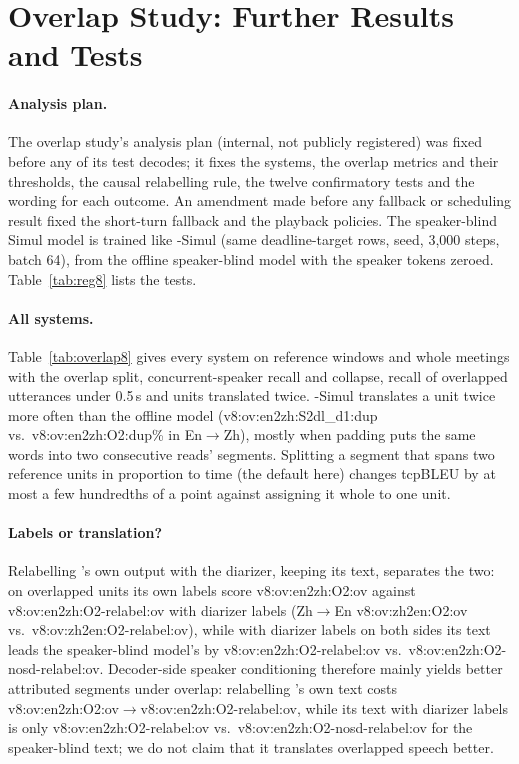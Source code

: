\section{Overlap Study: Further Results and Tests}
\label{app:v8}



\paragraph{Analysis plan.} The overlap study's analysis plan (internal, not publicly registered) was fixed before any
of its test decodes; it fixes the systems, the overlap metrics and their thresholds, the causal relabelling rule, the
twelve confirmatory tests and the wording for each outcome. An amendment made before any fallback or scheduling result
fixed the short-turn fallback and the playback policies.
The speaker-blind Simul model is trained like \sys{}-Simul (same deadline-target rows, seed, 3{,}000 steps, batch 64),
from the offline speaker-blind model with the speaker tokens zeroed. Table~\ref{tab:reg8} lists the tests.



\paragraph{All systems.} Table~\ref{tab:overlap8} gives every system on reference windows and whole meetings with the
overlap split, concurrent-speaker recall and collapse, recall of overlapped utterances under 0.5\,s and units translated
twice. \sys{}-Simul translates a unit twice more often than the offline model (\num{v8:ov:en2zh:S2dl_d1:dup} vs.\
\num{v8:ov:en2zh:O2:dup}\% in En$\rightarrow$Zh), mostly when padding puts the same words into two consecutive reads'
segments. Splitting a segment that spans two reference units in proportion to time (the default here) changes tcpBLEU by
at most a few hundredths of a point against assigning it whole to one unit.




\paragraph{Labels or translation?} Relabelling \sys{}'s own output with the diarizer, keeping its text, separates the
two: on overlapped units its own labels score \num{v8:ov:en2zh:O2:ov} against
\num{v8:ov:en2zh:O2-relabel:ov} with diarizer labels (Zh$\rightarrow$En \num{v8:ov:zh2en:O2:ov} vs.\
\num{v8:ov:zh2en:O2-relabel:ov}), while with diarizer labels on both sides its text leads the speaker-blind model's by
\num{v8:ov:en2zh:O2-relabel:ov} vs.\ \num{v8:ov:en2zh:O2-nosd-relabel:ov}. Decoder-side speaker conditioning therefore mainly yields better
attributed segments under overlap: relabelling \sys{}'s own text costs \num{v8:ov:en2zh:O2:ov}$\rightarrow$\num{v8:ov:en2zh:O2-relabel:ov},
while its text with diarizer labels is only \num{v8:ov:en2zh:O2-relabel:ov} vs.\ \num{v8:ov:en2zh:O2-nosd-relabel:ov} for the
speaker-blind text; we do not claim that it translates overlapped speech better.

